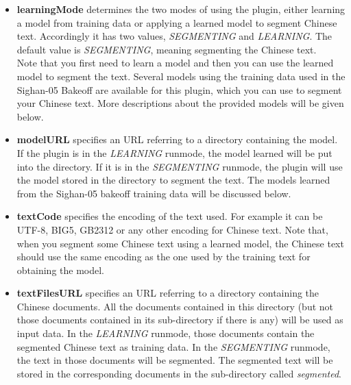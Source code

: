 \begin{itemize}
\item {\bf learningMode} determines the two modes of using the plugin, either
  learning a model from training data or applying a learned model to segment
  Chinese text.  Accordingly it has two values, {\em SEGMENTING} and {\em
    LEARNING}. The default value is
  {\em SEGMENTING}, meaning segmenting the Chinese text.\\
  Note that you first need to learn a model and then you can use the learned
  model to segment the text. Several models using the training data used in
  the Sighan-05 Bakeoff are available for this plugin, which you can use to
  segment your Chinese text. More descriptions about the provided models will
  be given below.
\item {\bf modelURL} specifies an URL referring to a directory containing the
  model. If the plugin is in the {\em LEARNING} runmode, the model learned
  will be put into the directory. If it is in the {\em SEGMENTING} runmode,
  the plugin will use the model stored in the directory to segment the
  text. The models learned from the Sighan-05 bakeoff training data will be
  discussed below.
\item {\bf textCode} specifies the encoding of the text used. For example it can
  be UTF-8, BIG5, GB2312 or any other encoding for Chinese text. Note that, when
  you segment some Chinese text using a learned model, the Chinese text should
  use the same encoding as the one used by the training text for obtaining the
  model.
\item {\bf textFilesURL} specifies an URL referring to a directory containing
  the Chinese documents. All the documents contained in this directory (but
  not those documents contained in its sub-directory if there is any) will be
  used as input data. In the {\em LEARNING} runmode, those documents contain
  the segmented Chinese text as training data. In the {\em SEGMENTING}
  runmode, the text in those documents will be segmented. The segmented text
  will be stored in the corresponding documents in the sub-directory called
  {\em segmented}.
\end{itemize}

